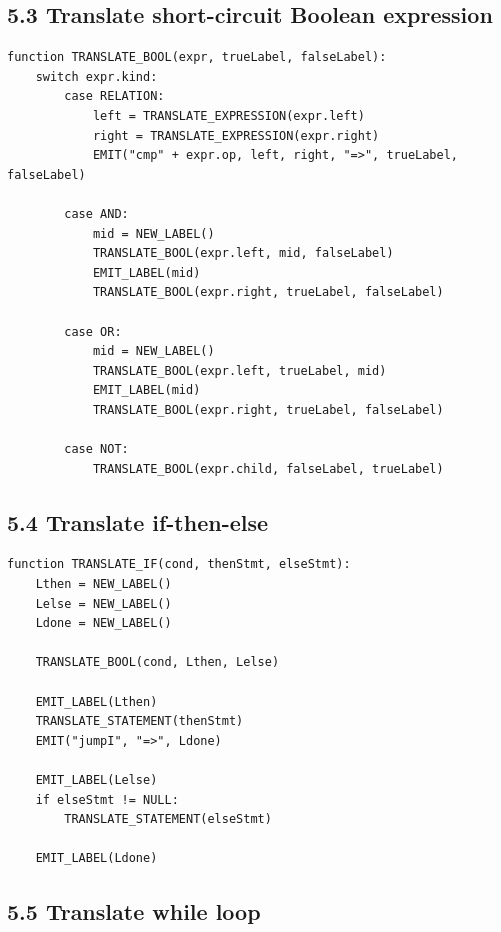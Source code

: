 \documentclass[10pt,letterpaper]{article}
\begin{document}
\subsection*{5.3 Translate short-circuit Boolean expression}
{}

\begin{verbatim}
function TRANSLATE_BOOL(expr, trueLabel, falseLabel):
    switch expr.kind:
        case RELATION:
            left = TRANSLATE_EXPRESSION(expr.left)
            right = TRANSLATE_EXPRESSION(expr.right)
            EMIT("cmp" + expr.op, left, right, "=>", trueLabel, falseLabel)

        case AND:
            mid = NEW_LABEL()
            TRANSLATE_BOOL(expr.left, mid, falseLabel)
            EMIT_LABEL(mid)
            TRANSLATE_BOOL(expr.right, trueLabel, falseLabel)

        case OR:
            mid = NEW_LABEL()
            TRANSLATE_BOOL(expr.left, trueLabel, mid)
            EMIT_LABEL(mid)
            TRANSLATE_BOOL(expr.right, trueLabel, falseLabel)

        case NOT:
            TRANSLATE_BOOL(expr.child, falseLabel, trueLabel)
\end{verbatim}

\subsection*{5.4 Translate if-then-else}
{}

\begin{verbatim}
function TRANSLATE_IF(cond, thenStmt, elseStmt):
    Lthen = NEW_LABEL()
    Lelse = NEW_LABEL()
    Ldone = NEW_LABEL()

    TRANSLATE_BOOL(cond, Lthen, Lelse)

    EMIT_LABEL(Lthen)
    TRANSLATE_STATEMENT(thenStmt)
    EMIT("jumpI", "=>", Ldone)

    EMIT_LABEL(Lelse)
    if elseStmt != NULL:
        TRANSLATE_STATEMENT(elseStmt)

    EMIT_LABEL(Ldone)
\end{verbatim}

\subsection*{5.5 Translate while loop}
{}
\end{document}
